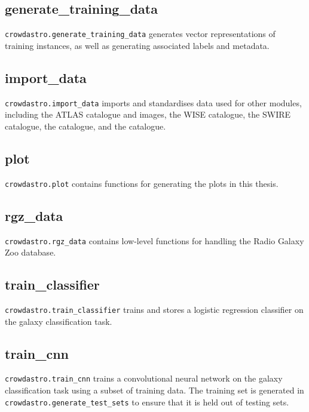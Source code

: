     \subsection{generate\_training\_data}

        \texttt{crowdastro.generate\_training\_data} generates vector
        representations of training instances, as well as generating associated
        labels and metadata.

    \subsection{import\_data}

        \texttt{crowdastro.import\_data} imports and standardises data used for
        other modules, including the ATLAS catalogue and images, the WISE
        catalogue, the SWIRE catalogue, the \citeauthor{norris06} catalogue, and
        the \citeauthor{fan15} catalogue.

    \subsection{plot}

        \texttt{crowdastro.plot} contains functions for generating the plots in
        this thesis.

    \subsection{rgz\_data}

        \texttt{crowdastro.rgz\_data} contains low-level functions for handling
        the Radio Galaxy Zoo database.

    \subsection{train\_classifier}

        \texttt{crowdastro.train\_classifier} trains and stores a logistic
        regression classifier on the galaxy classification task.

    \subsection{train\_cnn}

        \texttt{crowdastro.train\_cnn} trains a convolutional neural network on
        the galaxy classification task using a subset of training data. The
        training set is generated in\\\texttt{crowdastro.generate\_test\_sets}
        to ensure that it is held out of testing sets.
